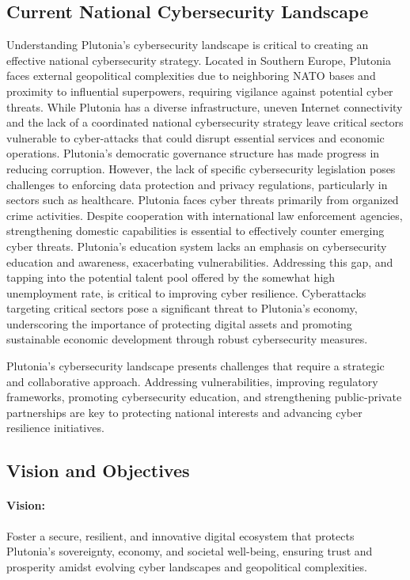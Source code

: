 \documentclass[
	a4paper, %
	10pt, %
]{CSSullivanBusinessReport}
\begin{document}
\begin{fullwidth}
\begin{justify}
\subsection{Current National Cybersecurity Landscape}
Understanding Plutonia's cybersecurity landscape is critical to creating an effective national cybersecurity strategy. Located in Southern Europe, Plutonia faces external geopolitical complexities due to neighboring NATO bases and proximity to influential superpowers, requiring vigilance against potential cyber threats. While Plutonia has a diverse infrastructure, uneven Internet connectivity and the lack of a coordinated national cybersecurity strategy leave critical sectors vulnerable to cyber-attacks that could disrupt essential services and economic operations. Plutonia's democratic governance structure has made progress in reducing corruption. However, the lack of specific cybersecurity legislation poses challenges to enforcing data protection and privacy regulations, particularly in sectors such as healthcare. Plutonia faces cyber threats primarily from organized crime activities. Despite cooperation with international law enforcement agencies, strengthening domestic capabilities is essential to effectively counter emerging cyber threats. Plutonia's education system lacks an emphasis on cybersecurity education and awareness, exacerbating vulnerabilities. Addressing this gap, and tapping into the potential talent pool offered by the somewhat high unemployment rate, is critical to improving cyber resilience. Cyberattacks targeting critical sectors pose a significant threat to Plutonia's economy, underscoring the importance of protecting digital assets and promoting sustainable economic development through robust cybersecurity measures. 

Plutonia's cybersecurity landscape presents challenges that require a strategic and collaborative approach. Addressing vulnerabilities, improving regulatory frameworks, promoting cybersecurity education, and strengthening public-private partnerships are key to protecting national interests and advancing cyber resilience initiatives.

\subsection{Vision and Objectives}
\paragraph{Vision:} Foster a secure, resilient, and innovative digital ecosystem that protects Plutonia's sovereignty, economy, and societal well-being, ensuring trust and prosperity amidst evolving cyber landscapes and geopolitical complexities.

\end{justify}
\end{fullwidth}
\end{document}
